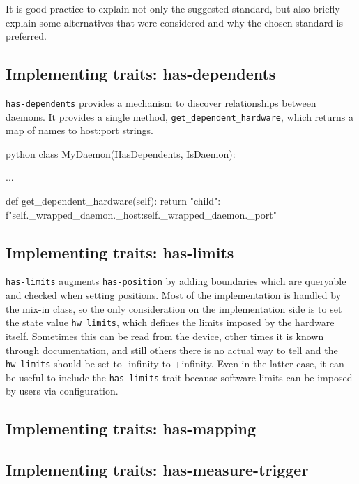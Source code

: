 It is good practice to explain not only the suggested standard, but also briefly explain some alternatives that were considered and why the chosen standard is preferred.

\subsection{Implementing traits: has-dependents}

\texttt{has-dependents} provides a mechanism to discover relationships between daemons.
It provides a single method, \texttt{get\_dependent\_hardware}, which returns a map of names to host:port strings.

\begin{codefragment}{python}
class MyDaemon(HasDependents, IsDaemon):

    ...

    def get_dependent_hardware(self):
        return {"child": f"{self._wrapped_daemon._host}:{self._wrapped_daemon._port}"}
\end{codefragment}

\subsection{Implementing traits: has-limits}

\texttt{has-limits} augments \texttt{has-position} by adding boundaries which are queryable and checked when setting positions.
Most of the implementation is handled by the mix-in class, so the only consideration on the implementation side is to set the state value \texttt{hw\_limits}, which defines the limits imposed by the hardware itself.
Sometimes this can be read from the device, other times it is known through documentation, and still others there is no actual way to tell and the \texttt{hw\_limits} should be set to -infinity to +infinity.
Even in the latter case, it can be useful to include the \texttt{has-limits} trait because software limits can be imposed by users via configuration.

\subsection{Implementing traits: has-mapping}

\subsection{Implementing traits: has-measure-trigger}

